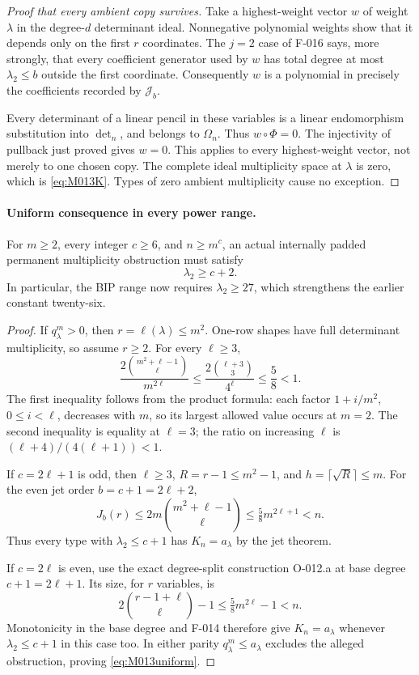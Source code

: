\begin{proof}[Proof that every ambient copy survives]
Take a highest-weight vector \(w\) of weight \(\lambda\)
in the degree-\(d\) determinant ideal. Nonnegative polynomial
weights show that it depends only on the first \(r\)
coordinates. The \(j=2\) case of F-016 says, more strongly,
that every coefficient generator used by \(w\) has total
degree at most \(\lambda_2\leq b\) outside the first
coordinate. Consequently \(w\) is a polynomial in precisely
the coefficients recorded by \(\mathcal J_b\).

Every determinant of a linear pencil in these variables is
a linear endomorphism substitution into \(\det_n\), and
belongs to \(\Omega_n\). Thus \(w\circ\Phi=0\).
The injectivity of pullback just proved gives \(w=0\).
This applies to every highest-weight vector, not merely to
one chosen copy. The complete ideal multiplicity space at
\(\lambda\) is zero, which is \eqref{eq:M013K}.
Types of zero ambient multiplicity cause no exception.
\end{proof}

\paragraph{Uniform consequence in every power range.}
For \(m\geq2\), every integer \(c\geq6\), and
\(n\geq m^c\), an actual internally padded permanent
multiplicity obstruction must satisfy
\begin{equation}\label{eq:M013uniform}
                              \lambda_2\geq c+2.
\end{equation}
In particular, the BIP range now requires \(\lambda_2\geq27\),
which strengthens the earlier constant twenty-six.

\begin{proof}
If \(q^m_\lambda>0\), then \(r=\ell(\lambda)\leq m^2\).
One-row shapes have full determinant multiplicity, so assume
\(r\geq2\). For every \(\ell\geq3\),
\[
 \frac{2\binom{m^2+\ell-1}{\ell}}{m^{2\ell}}
 \leq\frac{2\binom{\ell+3}{3}}{4^\ell}
 \leq\frac58<1.                                      \tag{M-013.2}
\]
The first inequality follows from the product formula:
each factor \(1+i/m^2\), \(0\leq i<\ell\), decreases
with \(m\), so its largest allowed value occurs at \(m=2\).
The second inequality is equality at \(\ell=3\); the
ratio on increasing \(\ell\) is
\((\ell+4)/(4(\ell+1))<1\).

If \(c=2\ell+1\) is odd, then \(\ell\geq3\),
\(R=r-1\leq m^2-1\), and \(h=\lceil\sqrt R\rceil\leq m\).
For the even jet order \(b=c+1=2\ell+2\),
\[
 J_b(r)\leq2m\binom{m^2+\ell-1}{\ell}
                      \leq\tfrac58m^{2\ell+1}<n.
\]
Thus every type with \(\lambda_2\leq c+1\) has
\(K_n=a_\lambda\) by the jet theorem.

If \(c=2\ell\) is even, use the exact degree-split
construction O-012.a at base degree \(c+1=2\ell+1\).
Its size, for \(r\) variables, is
\[
 2\binom{r-1+\ell}{\ell}-1
       \leq\tfrac58m^{2\ell}-1<n.
\]
Monotonicity in the base degree and F-014 therefore give
\(K_n=a_\lambda\) whenever \(\lambda_2\leq c+1\)
in this case too. In either parity \(q^m_\lambda\leq a_\lambda\)
excludes the alleged obstruction, proving \eqref{eq:M013uniform}.
\end{proof}

